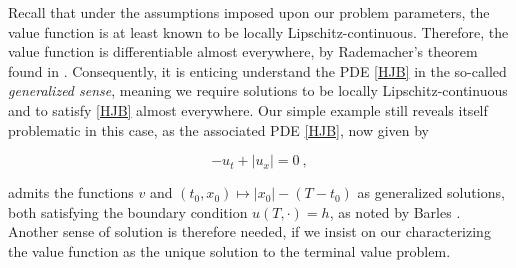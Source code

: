 	Recall that under the assumptions imposed upon our problem parameters, the value function is at least known to be locally Lipschitz-continuous. Therefore, the value function is differentiable almost everywhere, by Rademacher's theorem found in \cite{evans}. Consequently, it is enticing understand the PDE \eqref{HJB} in the so-called \emph{generalized sense}, meaning we require solutions to be locally Lipschitz-continuous and to satisfy \ref{HJB} almost everywhere. Our simple example still reveals itself problematic in this case, as the associated PDE \eqref{HJB}, now given by
	
	\begin{equation*}
		-u_t + \lvert u_x \rvert = 0 \ ,
	\end{equation*}
	
	admits the functions $ v $ and $ (t_0, x_0) \mapsto \lvert x_0 \rvert - (T - t_0) $ as generalized solutions, both satisfying the boundary condition $ u(T, \cdot) = h $, as noted by Barles \cite{barles}. Another sense of solution is therefore needed, if we insist on our characterizing the value function as the unique solution to the terminal value problem.